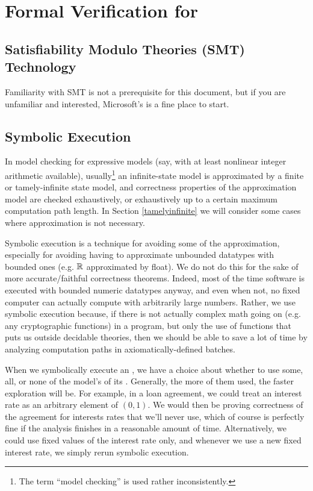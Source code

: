\documentclass[12pt]{article}
\newcommand{\term}[1]{\EM{\textsf{\hyperref[#1]{#1}}}\xspace}
\newcommand{\termz}[2]{\EM{\textsf{\hyperref[#1]{#2}}}\xspace}
\newcommand{\lsm}{\term{LSM}}
\newcommand{\statevars}{\term{statevars}}
\newcommand{\initvals}{\term{initvals}}
\newcommand{\statespace}{\termz{statespace}{state space}}
\begin{document}
\section{Formal Verification for \lsm} \label{lsmstatic}

\subsection{Satisfiability Modulo Theories (SMT) Technology}
Familiarity with SMT is not a prerequisite for this document, but if you are unfamiliar and interested, Microsoft's  is a fine place to start.

\subsection{Symbolic Execution} \label{symbexec}
In model checking for expressive models (say, with at least nonlinear integer arithmetic available), usually\footnote{The term ``model checking'' is used rather inconsistently.} an infinite-state model is approximated by a finite or tamely-infinite state model, and correctness properties of the approximation model are checked exhaustively, or exhaustively up to a certain maximum computation path length. In Section \ref{tamelyinfinite} we will consider some cases where approximation is not necessary.

Symbolic execution is a technique for avoiding some of the approximation, especially for avoiding having to approximate unbounded datatypes with bounded ones (e.g. $\mathbb{R}$ approximated by {\sf float}). We do not do this for the sake of more accurate/faithful correctness theorems. Indeed, most of the time software is executed with bounded numeric datatypes anyway, and even when not, no fixed computer can actually compute with arbitrarily large numbers. Rather, we use symbolic execution because, if there is not actually complex math going on (e.g. any cryptographic functions) in a program, but only the use of functions that puts us outside decidable theories, then we should be able to save a lot of time by analyzing computation paths in axiomatically-defined batches. 

\bigskip

When we symbolically execute an \lsm, we have a choice about whether to use some, all, or none of the model's \initvals of its \statevars. Generally, the more of them used, the faster \statespace exploration will be. For example, in a loan agreement, we could treat an interest rate as an arbitrary element of $(0,1)$. We would then be proving correctness of the agreement for interests rates that we'll never use, which of course is perfectly fine if the analysis finishes in a reasonable amount of time. Alternatively, we could use fixed values of the interest rate only, and whenever we use a new fixed interest rate, we simply rerun symbolic execution.
\end{document}
